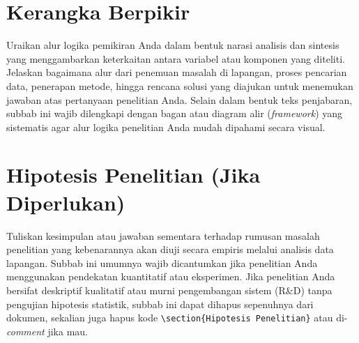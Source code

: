 \section{Kerangka Berpikir}

Uraikan alur logika pemikiran Anda dalam bentuk narasi analisis dan sintesis yang menggambarkan keterkaitan antara variabel atau komponen yang diteliti. Jelaskan bagaimana alur dari penemuan masalah di lapangan, proses pencarian data, penerapan metode, hingga rencana solusi yang diajukan untuk menemukan jawaban atas pertanyaan penelitian Anda. Selain dalam bentuk teks penjabaran, subbab ini wajib dilengkapi dengan bagan atau diagram alir (\textit{framework}) yang sistematis agar alur logika penelitian Anda mudah dipahami secara visual.



%
%
\section{Hipotesis Penelitian (Jika Diperlukan)}

Tuliskan kesimpulan atau jawaban sementara terhadap rumusan masalah penelitian yang kebenarannya akan diuji secara empiris melalui analisis data lapangan. Subbab ini umumnya wajib dicantumkan jika penelitian Anda menggunakan pendekatan kuantitatif atau eksperimen. Jika penelitian Anda bersifat deskriptif kualitatif atau murni pengembangan sistem (R\&D) tanpa pengujian hipotesis statistik, subbab ini dapat dihapus sepenuhnya dari dokumen, sekalian juga hapus kode \verb|\section{Hipotesis Penelitian}| atau di-\textit{comment} jika mau.